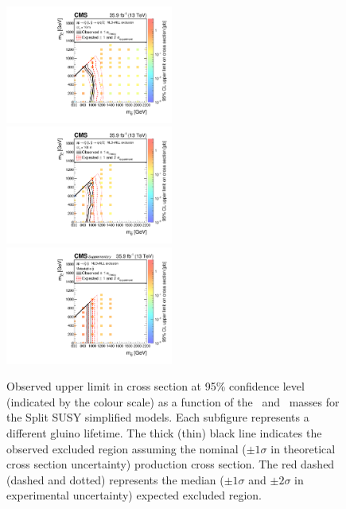 \begin{figure}[!t]
\centering
\includegraphics[width=0.49\textwidth]{figs/results/T1qqqqLL10000XSEC}~
\includegraphics[width=0.49\textwidth]{figs/results/T1qqqqLL100000XSEC}\\
\includegraphics[width=0.49\textwidth]{figs/results/T1qqqqLLStableXSEC}
\caption{Observed upper limit in cross section at 95\% confidence level 
(indicated by the colour scale) as a function of the \gluino~and 
\neutralino~masses for the Split SUSY simplified models. Each subfigure 
represents a different gluino lifetime. The thick (thin) black line indicates 
the observed excluded region assuming the nominal ($\pm1\sigma$ in theoretical 
cross section uncertainty) production cross section. The red dashed (dashed and 
dotted) represents the median ($\pm1\sigma$ and $\pm2\sigma$ in experimental 
uncertainty) expected excluded region.}
\label{fig:limits-individual-3}
\end{figure}
